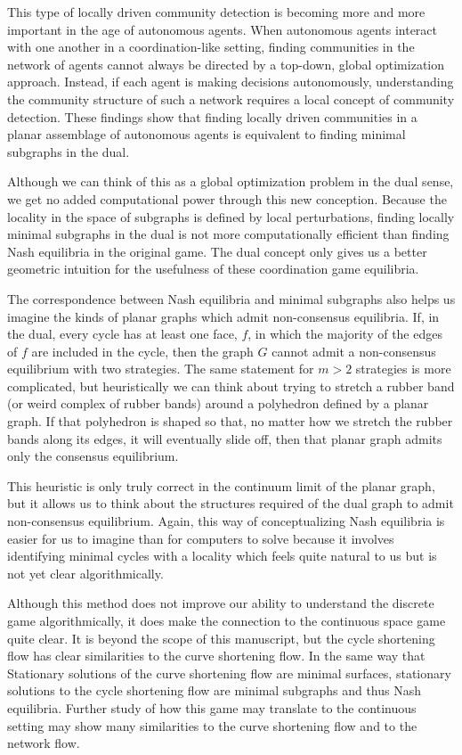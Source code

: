 \documentclass{article}
\begin{document}
This type of locally driven community detection is becoming more and more important in the age of autonomous agents. When autonomous agents interact with one another in a coordination-like setting, finding communities in the network of agents cannot always be directed by a top-down, global optimization approach. Instead, if each agent is making decisions autonomously, understanding the community structure of such a network requires a local concept of community detection. These findings show that finding locally driven communities in a planar assemblage of autonomous agents is equivalent to finding minimal subgraphs in the dual. 

Although we can think of this as a global optimization problem in the dual sense, we get no added computational power through this new conception. Because the locality in the space of subgraphs is defined by local perturbations, finding locally minimal subgraphs in the dual is not more computationally efficient than finding Nash equilibria in the original game. The dual concept only gives us a better geometric intuition for the usefulness of these coordination game equilibria. 

The correspondence between Nash equilibria and minimal subgraphs also helps us imagine the kinds of planar graphs which admit non-consensus equilibria. If, in the dual, every cycle has at least one face, $f$, in which the majority of the edges of $f$ are included in the cycle, then the graph $G$ cannot admit a non-consensus equilibrium with two strategies. The same statement for $m>2$ strategies is more complicated, but heuristically we can think about trying to stretch a rubber band (or weird complex of rubber bands) around a polyhedron defined by a planar graph. If that polyhedron is shaped so that, no matter how we stretch the rubber bands along its edges, it will eventually slide off, then that planar graph admits only the consensus equilibrium.


This heuristic is only truly correct in the continuum limit of the planar graph, but it allows us to think about the structures required of the dual graph to admit non-consensus equilibrium.  Again, this way of conceptualizing Nash equilibria is easier for us to imagine than for computers to solve because it involves identifying minimal cycles with a locality which feels quite natural to us but is not yet clear algorithmically. 

Although this method does not improve our ability to understand the discrete game algorithmically, it does make the connection to the continuous space game quite clear. It is beyond the scope of this manuscript, but the cycle shortening flow has clear similarities to the curve shortening flow. In the same way that Stationary solutions of the curve shortening flow are minimal surfaces, stationary solutions to the cycle shortening flow are minimal subgraphs and thus Nash equilibria. Further study of how this game may translate to the continuous setting may show many similarities to the curve shortening flow and to the network flow.
\end{document}
